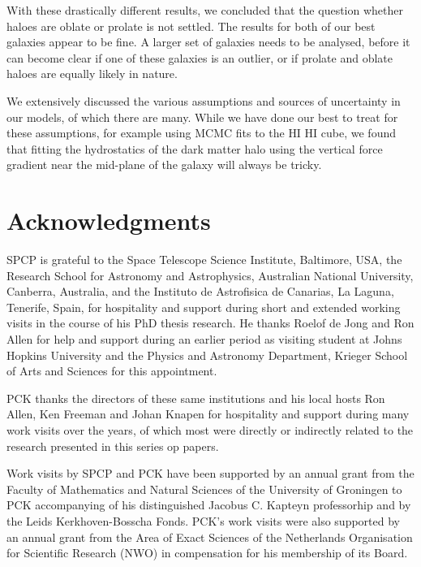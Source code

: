 \documentclass[useAMS,usenatbib]{mn2e}
\newcommand{\hi}{%
  \relax
  \ifmmode
    \textrm{\textsc{HI}}
  \else
    \textsc{H{\smaller}I}
  \fi
}
\begin{document}
With these drastically different results, we concluded that the question 
whether haloes are oblate or prolate is not settled. 
The results for both of our best galaxies appear to be fine. A  larger 
set of galaxies needs to be analysed, before it can become clear if one 
of these galaxies is an outlier, or if prolate and oblate haloes are 
equally likely in nature.

We extensively discussed the various assumptions and sources of 
uncertainty in our models, of which there are many.
While we have done our best to treat for these assumptions, for 
example using MCMC fits to the \hi cube, we found that fitting the 
hydrostatics of the dark matter halo using the vertical force gradient 
near the mid-plane of the galaxy will always be tricky.

\section*{Acknowledgments}
SPCP is grateful to the Space Telescope Science Institute, Baltimore, USA, the 
Research School for Astronomy and Astrophysics, Australian National University, 
Canberra, Australia, and the Instituto de Astrofisica de Canarias, La Laguna, 
Tenerife, Spain, for hospitality and support during  short and extended
working visits in the course of his PhD thesis research. He thanks
Roelof de Jong and Ron Allen for help and support during an earlier 
period as visiting student at Johns Hopkins University and 
the Physics and Astronomy Department, Krieger School of Arts and Sciences 
for this appointment.

PCK thanks the directors of these same institutions and his local hosts
Ron Allen, Ken Freeman and Johan Knapen for hospitality and support
during many work visits over the years, of which most were 
directly or indirectly related to the research presented in this series op 
papers.

Work visits by SPCP and PCK have been supported by an annual grant 
from the Faculty of Mathematics and Natural Sciences of 
the University of Groningen to PCK accompanying of his distinguished Jacobus 
C. Kapteyn professorhip and by the Leids Kerkhoven-Bosscha Fonds. PCK's work
visits were also supported by an annual grant from the Area  of Exact 
Sciences of the Netherlands Organisation for Scientific Research (NWO) in 
compensation for his membership of its Board.










\bsp

\label{lastpage}
\end{document}
